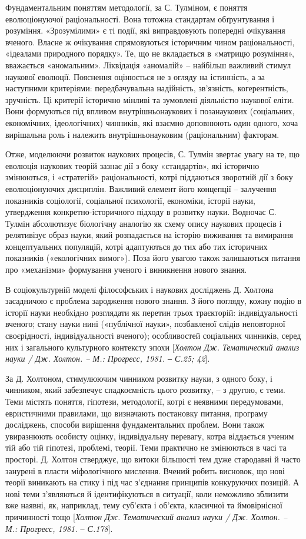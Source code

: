 Фундаментальним поняттям методології, за С. Тулміном, є поняття
еволюціонуючої раціональності. Вона тотожна стандартам обґрунтування і
розуміння. «Зрозумілими» є ті події, які виправдовують попередні очікування
вченого. Власне ж очікування спрямовуються історичним чином
раціональності, «ідеалами природного порядку». Те, що не вкладається в
«матрицю розуміння», вважається «аномальним». Ліквідація «аномалій» –
найбільш важливий стимул наукової еволюції. Пояснення оцінюється не з
огляду на істинність, а за наступними критеріями: передбачувальна надійність,
зв’язність, когерентність, зручність. Ці критерії історично мінливі та зумовлені
діяльністю наукової еліти. Вони формуються під впливом внутрішньонаукових
і позанаукових (соціальних, економічних, ідеологічних) чинників, які взаємно
доповнюють один одного, хоча вирішальна роль і належить
внутрішньонауковим (раціональним) факторам.

Отже, моделюючи розвиток наукових процесів, С. Тулмін звертає увагу на
те, що еволюція наукових теорій зазнає дії з боку «стандартів», які історично
змінюються, і «стратегій» раціональності, котрі піддаються зворотній дії з боку
еволюціонуючих дисциплін. Важливий елемент його концепції – залучення
показників соціології, соціальної психології, економіки, історії науки,
утвердження конкретно-історичного підходу в розвитку науки. Водночас С.
Тулмін абсолютизує біологічну аналогію як схему опису наукових процесів і
релятивізує образ науки, який розпадається на історію виживання та вимирання
концептуальних популяцій, котрі адаптуються до тих або тих історичних
показників («екологічних вимог»). Поза його увагою також залишаються
питання про «механізми» формування ученого і виникнення нового знання.

В соціокультурній моделі філософських і наукових досліджень Д. Холтона
засадничою є проблема зародження нового знання. З його погляду, кожну
подію в історії науки необхідно розглядати як перетин трьох траєкторій:
індивідуальності вченого; стану науки нині («публічної науки», позбавленої
слідів неповторної своєрідності, індивідуальності вченого); особливостей
соціальних чинників, серед них і загального культурного контексту эпохи
[\textit{Холтон Дж. Тематический анализ науки / Дж. Холтон. – М.: Прогресс, 1981. ‒
С.25; 42}].

За Д. Холтоном, стимулюючим чинником розвитку науки, з одного боку, і
чинником, який забезпечує спадкоємність цього розвитку, – з другою, є теми.
Теми містять поняття, гіпотези, методології, котрі є неявними передумовами,
евристичними правилами, що визначають постановку питання, програму
досліджень, способи вирішення фундаментальних проблем. Вони також
увиразнюють особисту оцінку, індивідуальну перевагу, котра віддається
ученим тій або тій гіпотезі, проблемі, теорії. Теми практично не змінюються в
часі та просторі. Д. Холтон стверджує, що витоки більшості тем дуже
стародавні й часто занурені в пласти міфологічного мислення. Вчений робить
висновок, що нові теорії виникають на стику і під час з’єднання принципів
конкуруючих позицій. А нові теми з’являються й ідентифікуються в ситуації,
коли неможливо зблизити вже наявні, як, наприклад, тему суб’єкта і об’єкта,
класичної та ймовірнісної причинності тощо [\textit{Холтон Дж. Тематический
анализ науки / Дж. Холтон. – М.: Прогресс, 1981. ‒ С.178}].


